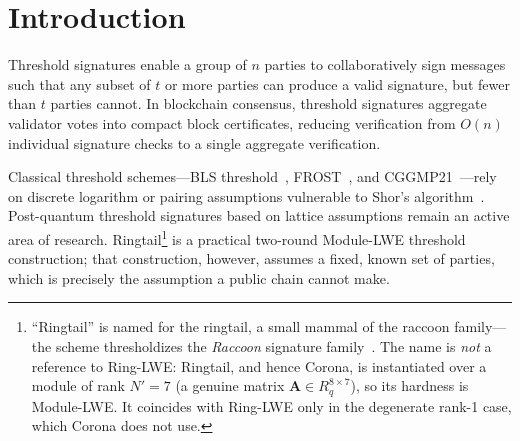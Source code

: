 \section{Introduction}

\label{sec:introduction}

Threshold signatures enable a group of $n$ parties to collaboratively sign messages
such that any subset of $t$ or more parties can produce a valid signature, but fewer
than $t$ parties cannot. In blockchain consensus, threshold signatures aggregate
validator votes into compact block certificates, reducing verification from $O(n)$
individual signature checks to a single aggregate verification.

Classical threshold schemes---BLS threshold~\cite{boldyreva2003threshold},
FROST~\cite{komlo2020frost}, and CGGMP21~\cite{canetti2021uc}---rely on discrete
logarithm or pairing assumptions vulnerable to Shor's algorithm~\cite{shor1997polynomial}.
Post-quantum threshold signatures based on lattice assumptions remain an active area
of research. Ringtail\footnote{``Ringtail'' is named for the ringtail, a small mammal of
the raccoon family---the scheme thresholdizes the \emph{Raccoon} signature
family~\cite{raccoon,traccoon}. The name is \emph{not} a reference to Ring-LWE: Ringtail,
and hence Corona, is instantiated over a module of rank $N' = 7$ (a genuine matrix
$\mathbf{A} \in R_q^{8 \times 7}$), so its hardness is Module-LWE. It coincides with
Ring-LWE only in the degenerate rank-1 case, which Corona does not use.} is a practical
two-round Module-LWE threshold construction; that construction, however, assumes a fixed,
known set of parties, which is precisely the assumption a public chain cannot make.

